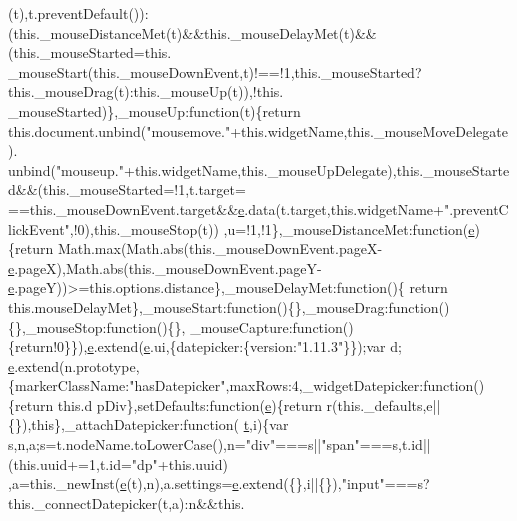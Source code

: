 \begin{DoxyCode}
      (t),t.preventDefault()):(this.\_mouseDistanceMet(t)&&this.\_mouseDelayMet(t)&&(this.\_mouseStarted=this.
      \_mouseStart(this.\_mouseDownEvent,t)!==!1,this.\_mouseStarted?this.\_mouseDrag(t):this.\_mouseUp(t)),!this.
      \_mouseStarted)\},\_mouseUp:function(t)\{\textcolor{keywordflow}{return} this.document.unbind(\textcolor{stringliteral}{"mousemove."}+this.widgetName,this.\_mouseMoveDelegate).
      unbind(\textcolor{stringliteral}{"mouseup."}+this.widgetName,this.\_mouseUpDelegate),this.\_mouseStarted&&(this.\_mouseStarted=!1,t.target=
      ==this.\_mouseDownEvent.target&&\hyperlink{jquery-ui_8min_8js_a2c038346d47955cbe2cb91e338edd7e1}{e}.data(t.target,\textcolor{keyword}{this}.widgetName+\textcolor{stringliteral}{".preventClickEvent"},!0),this.\_mouseStop(t))
      ,u=!1,!1\},\_mouseDistanceMet:\textcolor{keyword}{function}(\hyperlink{jquery-ui_8min_8js_a2c038346d47955cbe2cb91e338edd7e1}{e})\{\textcolor{keywordflow}{return} Math.max(Math.abs(\textcolor{keyword}{this}.\_mouseDownEvent.pageX-
      \hyperlink{jquery-ui_8min_8js_a2c038346d47955cbe2cb91e338edd7e1}{e}.pageX),Math.abs(this.\_mouseDownEvent.pageY-\hyperlink{jquery-ui_8min_8js_a2c038346d47955cbe2cb91e338edd7e1}{e}.pageY))>=this.options.distance\},\_mouseDelayMet:\textcolor{keyword}{function}()\{\textcolor{keywordflow}{
      return} this.mouseDelayMet\},\_mouseStart:\textcolor{keyword}{function}()\{\},\_mouseDrag:\textcolor{keyword}{function}()\{\},\_mouseStop:\textcolor{keyword}{function}()\{\},
      \_mouseCapture:\textcolor{keyword}{function}()\{\textcolor{keywordflow}{return}!0\}\}),\hyperlink{jquery-ui_8min_8js_a2c038346d47955cbe2cb91e338edd7e1}{e}.extend(\hyperlink{jquery-ui_8min_8js_a2c038346d47955cbe2cb91e338edd7e1}{e}.ui,\{datepicker:\{version:\textcolor{stringliteral}{"1.11.3"}\}\});var d;
      \hyperlink{jquery-ui_8min_8js_a2c038346d47955cbe2cb91e338edd7e1}{e}.extend(n.prototype,\{markerClassName:\textcolor{stringliteral}{"hasDatepicker"},maxRows:4,\_widgetDatepicker:function()\{return this.d
      pDiv\},setDefaults:\textcolor{keyword}{function}(\hyperlink{jquery-ui_8min_8js_a2c038346d47955cbe2cb91e338edd7e1}{e})\{return r(this.\_defaults,e||\{\}),\textcolor{keyword}{this}\},\_attachDatepicker:\textcolor{keyword}{function}(
      \hyperlink{jquery-2_80_83_8min_8js_aaccc9105df5383111407fd5b41255e23}{t},i)\{var s,n,a;s=t.nodeName.toLowerCase(),n=\textcolor{stringliteral}{"div"}===s||\textcolor{stringliteral}{"span"}===s,t.id||(this.uuid+=1,t.id=\textcolor{stringliteral}{"dp"}+this.uuid)
      ,a=this.\_newInst(\hyperlink{jquery-ui_8min_8js_a2c038346d47955cbe2cb91e338edd7e1}{e}(t),n),a.settings=\hyperlink{jquery-ui_8min_8js_a2c038346d47955cbe2cb91e338edd7e1}{e}.extend(\{\},i||\{\}),\textcolor{stringliteral}{"input"}===s?this.\_connectDatepicker(t,a):n&&this.

\end{DoxyCode}
